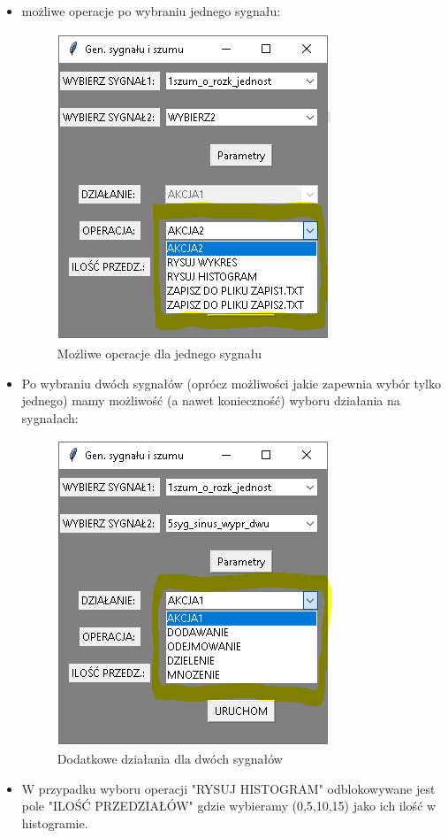 \documentclass[12pt]{article}
\begin{document}
\begin{itemize}
\item możliwe operacje po wybraniu jednego sygnału:
\begin{figure}[H]
\centering
\includegraphics[scale=0.9]{menu44.png}
\caption{Możliwe operacje dla jednego sygnału}
\end{figure}
\item Po wybraniu dwóch sygnałów (oprócz możliwości jakie zapewnia wybór tylko jednego) mamy możliwość (a nawet konieczność) wyboru działania na sygnałach:
\begin{figure}[H]
\centering
\includegraphics[scale=0.9]{menu55.png}
\caption{Dodatkowe działania dla dwóch sygnałów}
\end{figure}
\item W przypadku wyboru operacji "{RYSUJ HISTOGRAM}"{ }odblokowywane jest pole "ILOŚĆ PRZEDZIAŁÓW"{ }gdzie wybieramy (0,5,10,15) jako ich ilość w histogramie.

\end{itemize}
\end{document}
